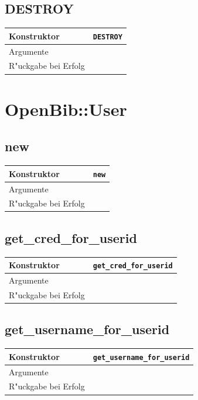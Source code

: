 \documentclass[11pt, twoside, a4paper, BCOR8mm, DIV12, bibtotoc,idxtotoc]{scrbook}
\begin{document}
\subsection{DESTROY}
\begin{shadowenv}
\begin{tabular}{lp{10cm}}
  Konstruktor & \texttt{DESTROY}\\
  \hline
  Argumente     & \\
  R"uckgabe bei Erfolg & \\
\end{tabular}
\end{shadowenv}

\section{OpenBib::User}


\subsection{new}
\begin{shadowenv}
\begin{tabular}{lp{10cm}}
  Konstruktor & \texttt{new}\\
  \hline
  Argumente     & \\
  R"uckgabe bei Erfolg & \\
\end{tabular}
\end{shadowenv}

\subsection{get\_cred\_for\_userid}
\begin{shadowenv}
\begin{tabular}{lp{10cm}}
  Konstruktor & \texttt{get\_cred\_for\_userid}\\
  \hline
  Argumente     & \\
  R"uckgabe bei Erfolg & \\
\end{tabular}
\end{shadowenv}

\subsection{get\_username\_for\_userid}
\begin{shadowenv}
\begin{tabular}{lp{10cm}}
  Konstruktor & \texttt{get\_username\_for\_userid}\\
  \hline
  Argumente     & \\
  R"uckgabe bei Erfolg & \\
\end{tabular}
\end{shadowenv}
\end{document}
